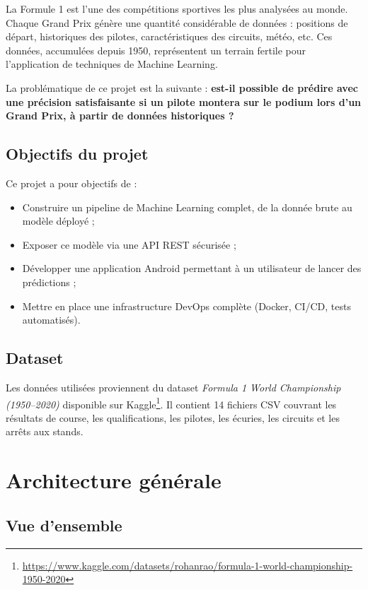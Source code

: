 \documentclass[12pt, a4paper]{article}
\begin{document}
La Formule 1 est l'une des compétitions sportives les plus analysées au monde. Chaque Grand Prix génère une quantité considérable de données : positions de départ, historiques des pilotes, caractéristiques des circuits, météo, etc. Ces données, accumulées depuis 1950, représentent un terrain fertile pour l'application de techniques de Machine Learning.

La problématique de ce projet est la suivante : \textbf{est-il possible de prédire avec une précision satisfaisante si un pilote montera sur le podium lors d'un Grand Prix, à partir de données historiques ?}

\subsection{Objectifs du projet}

Ce projet a pour objectifs de :
\begin{itemize}
    \item Construire un pipeline de Machine Learning complet, de la donnée brute au modèle déployé ;
    \item Exposer ce modèle via une API REST sécurisée ;
    \item Développer une application Android permettant à un utilisateur de lancer des prédictions ;
    \item Mettre en place une infrastructure DevOps complète (Docker, CI/CD, tests automatisés).
\end{itemize}

\subsection{Dataset}

Les données utilisées proviennent du dataset \textit{Formula 1 World Championship (1950–2020)} disponible sur Kaggle\footnote{\url{https://www.kaggle.com/datasets/rohanrao/formula-1-world-championship-1950-2020}}. Il contient 14 fichiers CSV couvrant les résultats de course, les qualifications, les pilotes, les écuries, les circuits et les arrêts aux stands.

\section{Architecture générale}

\subsection{Vue d'ensemble}
\end{document}
